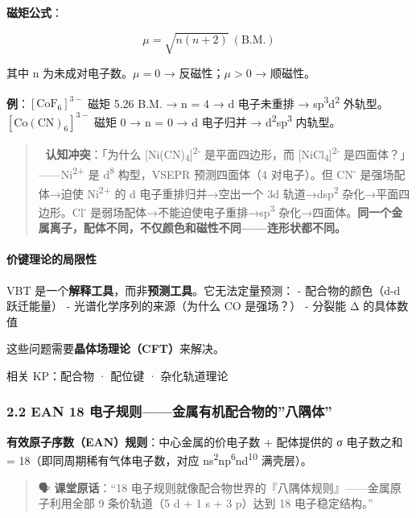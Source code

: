 \documentclass[a4paper,11pt]{ctexart}
\begin{document}
\textbf{磁矩公式}：

\[
\mu = \sqrt{n(n+2)}\ (\text{B.M.})
\]

其中 n 为未成对电子数。\(\mu = 0\) → 反磁性；\(\mu > 0\) → 顺磁性。

\textbf{例}：\([\mathrm{CoF_6}]^{3-}\) 磁矩 5.26 B.M. → n = 4 → d 电子未重排 → sp\textsuperscript{3}d\textsuperscript{2} 外轨型。
\([\mathrm{Co(CN)_6}]^{3-}\) 磁矩 0 → n = 0 → d 电子归并 → d\textsuperscript{2}sp\textsuperscript{3} 内轨型。

\begin{quote}
🧠 \textbf{认知冲突}：「为什么 {[}Ni(CN)\textsubscript{4}{]}\textsuperscript{2-} 是平面四边形，而 {[}NiCl\textsubscript{4}{]}\textsuperscript{2-} 是四面体？」------Ni\textsuperscript{2+} 是 d\textsuperscript{8} 构型，VSEPR 预测四面体（4 对电子）。但 CN\textsuperscript{-} 是强场配体→迫使 Ni\textsuperscript{2+} 的 d 电子重排归并→空出一个 3d 轨道→dsp\textsuperscript{2} 杂化→平面四边形。Cl\textsuperscript{-} 是弱场配体→不能迫使电子重排→sp\textsuperscript{3} 杂化→四面体。\textbf{同一个金属离子，配体不同，不仅颜色和磁性不同------连形状都不同。}
\end{quote}

\paragraph{价键理论的局限性}\label{ux4ef7ux952eux7406ux8bbaux7684ux5c40ux9650ux6027}

VBT 是一个\textbf{解释工具}，而非\textbf{预测工具}。它无法定量预测：
- 配合物的颜色（d-d 跃迁能量）
- 光谱化学序列的来源（为什么 CO 是强场？）
- 分裂能 Δ 的具体数值

这些问题需要\textbf{晶体场理论（CFT）}来解决。

相关 KP：配合物 · 配位键 · 杂化轨道理论

\subsubsection{2.2 EAN 18 电子规则------金属有机配合物的''八隅体''}\label{ean-18-ux7535ux5b50ux89c4ux5219ux91d1ux5c5eux6709ux673aux914dux5408ux7269ux7684ux516bux9685ux4f53}

\textbf{有效原子序数（EAN）规则}：中心金属的价电子数 + 配体提供的 σ 电子数之和 = 18（即同周期稀有气体电子数，对应 ns\textsuperscript{2}np\textsuperscript{6}nd\textsuperscript{10} 满壳层）。

\begin{quote}
🗣️ \textbf{课堂原话}：``18 电子规则就像配合物世界的『八隅体规则』------金属原子利用全部 9 条价轨道（5 d + 1 s + 3 p）达到 18 电子稳定结构。''
\end{quote}
\end{document}
